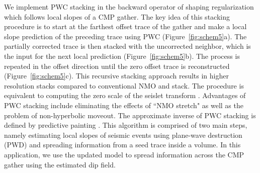 We implement PWC stacking in the backward operator of shaping regularization which follows
local slopes of a CMP gather. The key idea of this stacking procedure is
to start at the farthest offset trace of the gather and make a local slope prediction of the preceding trace using 
PWC (Figure~\ref{fig:schem5}a). The partially corrected trace is then stacked with the uncorrected neighbor, 
which is the input for the next local prediction (Figure~\ref{fig:schem5}b). The process is repeated in the 
offset direction until the zero offset trace is reconstructed (Figure~\ref{fig:schem5}c). 
This recursive stacking approach results in higher resolution stacks compared 
to conventional NMO and stack. The procedure is equivalent to computing the zero scale of the seislet transform 
\cite[]{fomel3}. Advantages of PWC stacking include eliminating 
the effects of ``NMO stretch" as well as the problem of non-hyperbolic moveout. 
The approximate inverse of PWC stacking is defined by predictive painting \cite[]{fomel6}. 
This algorithm is comprised of two main steps, namely estimating 
local slopes of seismic events using plane-wave destruction (PWD) \cite[]{fomel5} and spreading information from a seed 
trace inside a volume. In this application, we use the updated model to spread information 
across the CMP gather using the estimated dip field.


